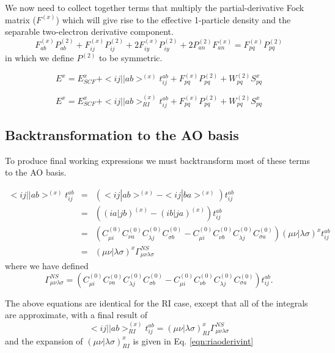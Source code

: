 \documentclass[fleqn,12pt]{article}
\newcommand{\bra}{<\!}
\newcommand{\ket}{\!>}
\newcommand{\tijab}{{t_{ij}^{ab}}}
\newcommand{\Ptwo}{P^{(2)}}
\newcommand{\Wtwo}{W^{(2)}}
\newcommand{\Fx}{F^{(x)}}
\newcommand{\intari}[2]{\bra #1 || #2 \ket_{RI}}
\newcommand{\intmri}[2]{( #1 | #2 )_{RI}}
\newcommand{\inta}[2]{\bra #1 || #2 \ket}
\newcommand{\intd}[2]{\bra #1 | #2 \ket}
\newcommand{\intm}[2]{( #1 | #2 )}
\newcommand{\Czero}{C^{(0)}}
\begin{document}
We now need to collect together terms that multiply the 
partial-derivative Fock matrix ($\Fx$) which will give rise to the
effective 1-particle density and the separable two-electron derivative
component.
\begin{equation}
  \Fx_{ab} \Ptwo_{ab} + \Fx_{ij} \Ptwo_{ij} + 2\Fx_{iy}
  \Ptwo_{iy} + 2 \Ptwo_{an} \Fx_{an} = \Fx_{pq} \Ptwo_{pq}
\end{equation}
in which we define $\Ptwo$ to be symmetric.  

\begin{equation}
 E^x = E^x_{SCF} + \bra ij || ab \ket^{(x)} \tijab + \Fx_{pq} \Ptwo_{pq}
 + \Wtwo_{pq} S^{x}_{pq}
\end{equation}
\begin{changebar}
\begin{equation}
 E^x = E^x_{SCF} + \intari{ij}{ab}^{(x)} \tijab + \Fx_{pq} \Ptwo_{pq}
 + \Wtwo_{pq} S^{x}_{pq}
\end{equation}
\end{changebar}

\subsection{Backtransformation to the AO basis}

To produce final working expressions we must backtransform most of
these terms to the AO basis.

\begin{eqnarray}
\inta{ij}{ab}^{(x)} \tijab 
 & = & ( \intd{ij}{ab}^{(x)} - \intd{ij}{ba}^{(x)} ) \tijab \\
 & = & ( \intm{ia}{jb}^{(x)} - \intm{ib}{ja}^{(x)} ) \tijab \\
 & = & ( \Czero_{\mu i} \Czero_{\nu a} \Czero_{\lambda j} \Czero_{\sigma b}
   - \Czero_{\mu i} \Czero_{\nu b} \Czero_{\lambda j} \Czero_{\sigma a} )
   \intm{\mu \nu}{\lambda \sigma}^{x} \tijab \\
 & = & \intm{\mu \nu}{\lambda \sigma}^{x} \Gamma^{NS}_{\mu\nu\lambda\sigma}
\end{eqnarray}
where we have defined
\begin{equation}
\Gamma^{NS}_{\mu\nu\lambda\sigma} = 
( \Czero_{\mu i} \Czero_{\nu a} \Czero_{\lambda j} \Czero_{\sigma b}
  - \Czero_{\mu i} \Czero_{\nu b} \Czero_{\lambda j} \Czero_{\sigma a}) 
\tijab .
\end{equation}
\begin{changebar}
The above equations are identical for the RI case, except that all of
the integrals are approximate, with a final result of
\begin{equation}
\intari{ij}{ab}^{(x)} \tijab 
 = \intmri{\mu \nu}{\lambda \sigma}^{x} \Gamma^{NS}_{\mu\nu\lambda\sigma}
\end{equation}
and the expansion of $\intmri{\mu\nu}{\lambda\sigma}^{x}$ is given
in Eq. \ref{eqn:riaoderivint}
\end{changebar}
\end{document}
